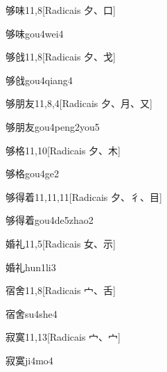 \begin{entry}{够味}{11,8}[Radicais ⼣、⼝]
  \begin{phonetics}{够味}{gou4wei4}
  \end{phonetics}
\end{entry}

\begin{entry}{够戗}{11,8}[Radicais ⼣、⼽]
  \begin{phonetics}{够戗}{gou4qiang4}
  \end{phonetics}
\end{entry}

\begin{entry}{够朋友}{11,8,4}[Radicais ⼣、⽉、⼜]
  \begin{phonetics}{够朋友}{gou4peng2you5}
  \end{phonetics}
\end{entry}

\begin{entry}{够格}{11,10}[Radicais ⼣、⽊]
  \begin{phonetics}{够格}{gou4ge2}
  \end{phonetics}
\end{entry}

\begin{entry}{够得着}{11,11,11}[Radicais ⼣、⼻、⽬]
  \begin{phonetics}{够得着}{gou4de5zhao2}
  \end{phonetics}
\end{entry}

\begin{entry}{婚礼}{11,5}[Radicais ⼥、⽰]
  \begin{phonetics}{婚礼}{hun1li3}
  \end{phonetics}
\end{entry}

\begin{entry}{宿舍}{11,8}[Radicais ⼧、⾆]
  \begin{phonetics}{宿舍}{su4she4}
  \end{phonetics}
\end{entry}

\begin{entry}{寂寞}{11,13}[Radicais ⼧、⼧]
  \begin{phonetics}{寂寞}{ji4mo4}
  \end{phonetics}
\end{entry}

